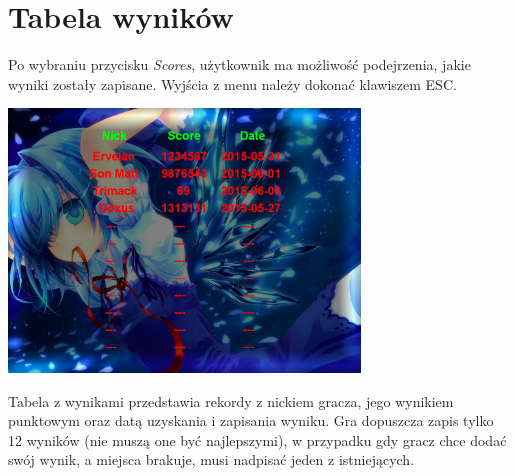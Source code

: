 	\section{Tabela wyników}
		Po wybraniu przycisku \emph{Scores}, użytkownik ma możliwość podejrzenia, jakie wyniki zostały zapisane. Wyjścia z menu należy dokonać klawiszem ESC.
		\begin{center}
			\includegraphics[width=0.7\textwidth]{./images/scores_clear}
		\end{center}
		Tabela z wynikami przedstawia rekordy z nickiem gracza, jego wynikiem punktowym oraz datą uzyskania i zapisania wyniku. Gra dopuszcza zapis tylko 12 wyników (nie muszą one być najlepszymi), w przypadku gdy gracz chce dodać swój wynik, a miejsca brakuje, musi nadpisać jeden z istniejących.
	\newpage
